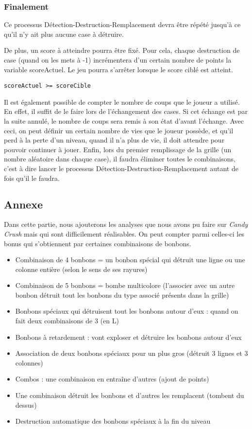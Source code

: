 \subsubsection{Finalement}

Ce processus Détection-Destruction-Remplacement devra être répété jusqu'à ce qu'il n'y ait plus aucune case à détruire.

De plus, un score à atteindre pourra être fixé. Pour cela, chaque destruction de case (quand on les mets à -1) incrémentera d'un certain nombre de points la variable scoreActuel. Le jeu pourra s'arrêter lorsque le score ciblé est atteint.
\begin{lstlisting}
scoreActuel >= scoreCible
\end{lstlisting}

Il est également possible de compter le nombre de coups que le joueur a utilisé. En effet, il suffit de le faire lors de l'échangement des cases. Si cet échange est par la suite annulé, le nombre de coups sera remis à son état d'avant l'échange.
Avec ceci, on peut définir un certain nombre de vies que le joueur possède, et qu'il perd à la perte d'un niveau, quand il n'a plus de vie, il doit attendre pour pouvoir continuer à jouer.
Enfin, lors du premier remplissage de la grille (un nombre aléatoire dans chaque case), il faudra éliminer toutes le combinaisons, c'est à dire lancer le processus Détection-Destruction-Remplacement autant de fois qu'il le faudra.

\subsection{Annexe}
Dans cette partie, nous ajouterons les analyses que nous avons pu faire sur \emph{Candy Crush} mais qui sont difficilement réalisables.
On peut compter parmi celles-ci les bonus qui s'obtiennent par certaines combinaisons de bonbons.
\begin{itemize}

\item
	Combinaison de 4 bonbons = un bonbon spécial qui détruit une ligne ou une colonne entière (selon le sens de ses rayures)

\item
	Combinaison de 5 bonbons = bombe multicolore (l'associer avec un autre bonbon détruit tout les bonbons du type associé présents dans la grille)
\item
	Bonbons spéciaux qui détruisent tout les bonbons autour d'eux : quand on fait deux combinaisons de 3 (en L)
\item
	Bonbons à retardement : vont exploser et détruire les bonbons autour d'eux 
\item
	Association de deux bonbons spéciaux pour un plus gros (détruit 3 lignes et 3 colonnes)      
\item
	Combos : une combinaison en entraîne d'autres (ajout de points)
\item
	Une combinaison détruit les bonbons et d'autres les remplacent (tombent du dessus) 
\item
	Destruction automatique des bonbons spéciaux à la fin du niveau

\end{itemize}
